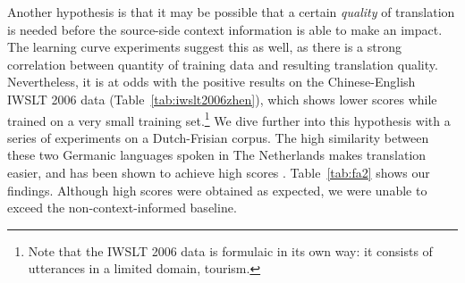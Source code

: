 \documentclass[smallextended]{svjour3}       %
\theoremstyle{break}
\begin{document}
Another hypothesis is that it may be possible that a certain \emph{quality} of
translation is needed before the source-side context information is able to
make an impact. The learning curve experiments suggest this as well, as there
is a strong correlation between quantity of training data and resulting
translation quality. Nevertheless, it is at odds with the positive results on
the Chinese-English IWSLT 2006 data (Table~\ref{tab:iwslt2006zhen}), which
shows lower scores while trained on a very small training set.\footnote{Note
that the IWSLT 2006 data is formulaic in its own way: it consists of utterances
in a limited domain, tourism.} We dive further into this hypothesis with a
series of experiments on a Dutch-Frisian corpus. The high similarity between
these two Germanic languages spoken in The Netherlands makes translation
easier, and has been shown to achieve high scores \citep{OERSETTER}.
Table~\ref{tab:fa2} shows our findings. Although high scores were obtained as
expected, we were unable to exceed the non-context-informed baseline.
\end{document}
